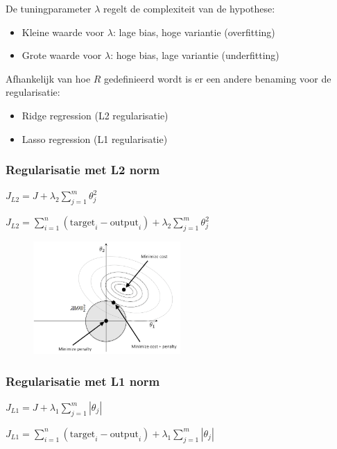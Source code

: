 \documentclass{article}
\begin{document}
De tuningparameter $\lambda$ regelt de complexiteit van de hypothese:

\begin{itemize}
    \item Kleine waarde voor $\lambda$: lage bias, hoge variantie (overfitting)
    \item Grote waarde voor $\lambda$: hoge bias, lage variantie (underfitting)
\end{itemize}

Afhankelijk van hoe $R$ gedefinieerd wordt is er een andere benaming voor de regularisatie:

\begin{itemize}
    \item Ridge regression (L2 regularisatie)
    \item Lasso regression (L1 regularisatie)
\end{itemize}

\subsubsection{Regularisatie met L2 norm}

\begin{center}
$J_{L2} = J + \lambda_2 \sum_{j=1}^m \theta_j^2$

$J_{L2} = \sum_{i=1}^n (\text{target}_i - \text{output}_i) + \lambda_2 \sum_{j=1}^m \theta_j^2$
\end{center}

\begin{figure}[H]
    \centering
    \includegraphics[width=0.5\textwidth]{regularisatie-l2.png}
    \caption{}
\end{figure}

\subsubsection{Regularisatie met L1 norm}

\begin{center}
$J_{L1} = J + \lambda_1 \sum_{j=1}^m |\theta_j|$

$J_{L1} = \sum_{i=1}^n (\text{target}_i - \text{output}_i) + \lambda_1 \sum_{j=1}^m |\theta_j|$
\end{center}
\end{document}
